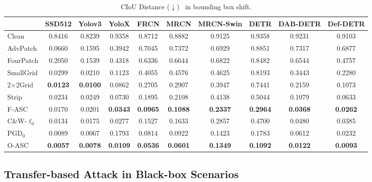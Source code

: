 \documentclass[times,twocolumn,final,authoryear]{elsarticle}
\begin{document}
\begin{table*}[]
\centering
\caption{CIoU Distance ($\downarrow$)~\citep{zheng2020distance} in bounding box shift. }
\begin{tabular}{l|ccccccccc}
\hline
                & SSD512    & Yolov3    & YoloX     & FRCN      & MRCN      & MRCN-Swin  & DETR      &  DAB-DETR     &    Def-DETR      \\ \hline
\hline
Clean           & 0.8416    & 0.8239    &  0.9358   & 0.8712    & 0.8882    &  0.9125    & 0.9358    &  0.9231       &    0.9103               \\\hline
AdvPatch        &  0.0660   & 0.1595    &  0.3942   & 0.7045    & 0.7372    &  0.6929    &  0.8851   &  0.7317       &    0.6877               \\
FourPatch       &  0.2050   &  0.1539   &  0.4318   & 0.6336    & 0.6644    &   0.6822   & 0.8482    &  0.6544       &    0.4757               \\
SmallGrid       &  0.0299   & 0.0210    &  0.1123   & 0.4055    &  0.4576   & 0.4625     & 0.8193    &   0.3443      &    0.2280               \\ 
2$\times$2Grid  &\bf{0.0123}&\bf{0.0100}&  0.0862   & 0.2705    &  0.2907   &   0.3947   & 0.7441    &  0.2159       &    0.1073               \\
Strip           & 0.0234    & 0.0249    &  0.0730   & 0.1895    & 0.2108    &  0.4138    & 0.5044    & 0.1079        &    0.0633               \\
F-ASC           & 0.0170    & 0.0201    &\bf{0.0343}&\bf{0.0965}&\bf{0.1088}& \bf{0.2337}&\bf{0.2964}& \bf{0.0368}   &    \bf{0.0262}              \\  \hline\hline
C\&W-$\ell_0$   & 0.0134    & 0.0175    &  0.0277   & 0.1527    & 0.1633    &  0.2857    & 0.4700    &  0.0480       &  0.0385        \\ 
PGD$_0$         & 0.0089    & 0.0067    & 0.1793    & 0.0814    & 0.0922    &  0.1423    & 0.1783    & 0.0612        &    0.0232               \\
O-ASC           &\bf{0.0057}&\bf{0.0078}&\bf{0.0109}&\bf{0.0536}&\bf{0.0601}&\bf{0.1349} &\bf{0.1092}&  \bf{0.0122}   &   \bf{0.0093}                \\ \hline
\end{tabular}
\label{tab:shift}

\end{table*}



\subsection{Transfer-based Attack in Black-box Scenarios}
\end{document}
